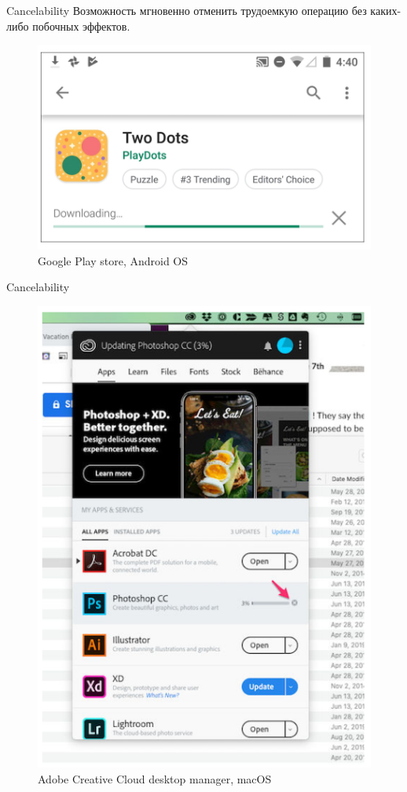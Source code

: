 \documentclass{beamer}
\begin{document}
\begin{frame}[t]{Cancelability}
	Возможность мгновенно отменить трудоемкую операцию без каких-либо побочных эффектов.
	
	\begin{figure}[h]
		\centering
		\includegraphics[scale=0.6]{images/lec08-pic22.png}
		\caption{Google Play store, Android OS}
	\end{figure}
\end{frame}

\begin{frame}[t]{Cancelability}
	\begin{figure}[h]
		\centering
		\includegraphics[scale=0.5]{images/lec08-pic23.png}
		\caption{Adobe Creative Cloud desktop manager, macOS}
	\end{figure}
\end{frame}
\end{document}
